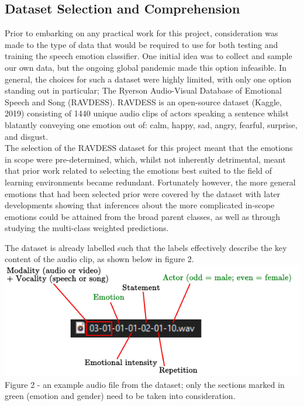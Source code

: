 \documentclass[12pt]{article}
\begin{document}
\subsection{Dataset Selection and Comprehension}
Prior to embarking on any practical work for this project, consideration was made to the type of data that would be required to use for both testing and training the speech emotion classifier. One initial idea was to collect and sample our own data, but the ongoing global pandemic made this option infeasible. In general, the choices for such a dataset were highly limited, with only one option standing out in particular; The Ryerson Audio-Visual Database of Emotional Speech and Song (RAVDESS). RAVDESS is an open-source dataset (Kaggle, 2019) consisting of 1440 unique audio clips of actors speaking a sentence whilst blatantly conveying one emotion out of: calm, happy, sad, angry, fearful, surprise, and disgust.
\\

\noindent The selection of the RAVDESS dataset for this project meant that the emotions in scope were pre-determined, which, whilst not inherently detrimental, meant that prior work related to selecting the emotions best suited to the field of learning environments became redundant. Fortunately however, the more general emotions that had been selected prior were covered by the dataset with later developments showing that inferences about the more complicated in-scope emotions could be attained from the broad parent classes, as well as through studying the multi-class weighted predictions.

\noindent The dataset is already labelled such that the labels effectively describe the key content of the audio clip, as shown below in figure 2.
\\

\includegraphics{figure_2_dataset_audio_example}
Figure 2 - an example audio file from the dataset; only the sections marked in green (emotion and gender) need to be taken into consideration.
\\
\end{document}
